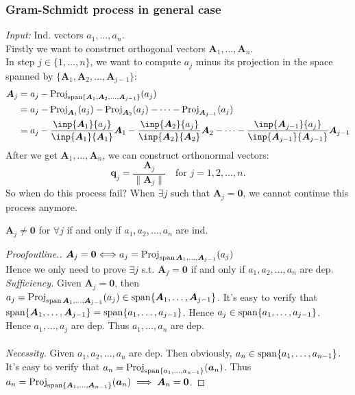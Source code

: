 \subsubsection{Gram-Schmidt process in general case}
\emph{Input: }Ind. vectors $a_1,\dots,a_n$.\\
Firstly we want to construct orthogonal vectors $\bm A_1,\dots,\bm A_n$.\\
In step $j\in\{1,\dots,n\}$, we want to compute $a_j$ minus its projection in the space spanned by $\{\bm A_1,\bm A_2,\dots,\bm A_{j-1}\}$:
\[
\begin{aligned}
\bm A_j&=a_j-\Proj_{\Span\{\bm A_1,\bm A_2,\dots,\bm A_{j-1}\}}(a_j)\\
&=a_j-\Proj_{\bm A_1}(a_j)-\Proj_{\bm A_2}(a_j)-\dots-\Proj_{\bm A_{j-1}}(a_j)\\
&=a_j-\frac{\inp{\bm A_1}{a_j}}{\inp{\bm A_1}{\bm A_1}}\bm A_1-\frac{\inp{\bm A_2}{a_j}}{\inp{\bm A_2}{\bm A_2}}\bm A_2-\dots-\frac{\inp{\bm A_{j-1}}{a_j}}{\inp{\bm A_{j-1}}{\bm A_{j-1}}}\bm A_{j-1}
\end{aligned}
\]
After we get $\bm A_1,\dots,\bm A_n$, we can construct orthonormal vectors:
\[
\bm q_j=\frac{\bm A_j}{\|\bm A_j\|}\quad\text{for }j=1,2,\dots,n.
\]
So when do this process fail? When $\exists j$ such that $\bm A_j=\bm 0$, we cannot continue this process anymore.
\begin{proposition}
$\bm A_j\ne\bm0$ for $\forall j$ if and only if $a_1,a_2,\dots,a_n$ are ind.
\end{proposition}
\begin{proof}[Proofoutline.]
$\bm A_j=\bm0\Longleftrightarrow
a_j=\operatorname{Proj}_{\operatorname{span}{\bm A_1,\dots,\bm A_{j-1}}}(a_j)$\\
Hence we only need to prove $\exists j$ s.t. $\bm A_j=\bm 0$ if and only if $a_1,a_2,\dots,a_n$ are dep.\\
\textit{Sufficiency. }Given $\bm A_j=\bm0$, then $a_j=\operatorname{Proj}_{\operatorname{span}{\bm A_1,\dots,\bm A_{j-1}}}(a_j)\in\operatorname{span}\{\bm A_1,\dots,\bm A_{j-1}\}$. It's easy to verify that $\operatorname{span}\{\bm A_1,\dots,\bm A_{j-1}\}=\operatorname{span}\{a_1,\dots,a_{j-1}\}$. Hence $a_j\in\operatorname{span}\{a_1,\dots,a_{j-1}\}$. \\Hence $a_1,\dots,a_j$ are dep. Thus $a_1,\dots,a_n$ are dep.\\\\
\textit{Necessity. }Given $a_1,a_2,\dots,a_n$ are dep. Then obviously, $a_n\in\operatorname{span}\{a_1,\dots,a_{n-1}\}$. It's easy to verify that $a_n=\operatorname{Proj}_{\operatorname{span}\{a_1,\dots,a_{n-1}\}}(\bm a_n)$. Thus $a_n=\operatorname{Proj}_{\operatorname{span}\{\bm A_1,\dots,\bm A_{n-1}\}}(\bm a_n)\implies \bm A_n=\bm0$.
\end{proof}
